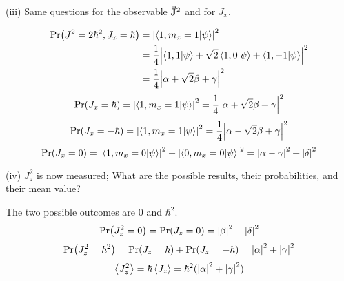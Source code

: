 \documentclass[a4paper,twoside]{article}
\begin{document}
\begin{itemize}
        \subitem(iii) Same questions for the observable $ \va{J}^2 $ and for $ J_x $.
        \begin{problem}
            \begin{align}
                \Pr(J^2 = 2 \hbar^2, J_x = \hbar) &= \abs{\bra{1, m_x = 1}\ket{\psi}}^2 \\
                &= \frac{1}{4} \abs{\bra{1,1}\ket{\psi} + \sqrt{2}\bra{1,0}\ket{\psi} +\bra{1,-1}\ket{\psi}}^2 \\
                &= \frac{1}{4} \abs{\alpha + \sqrt{2} \beta + \gamma}^2
            \end{align}
            \begin{equation}
                \Pr(J_x = \hbar) = \abs{\bra{1,m_x = 1}\ket{\psi}}^2 = \frac{1}{4} \abs{\alpha + \sqrt{2} \beta + \gamma}^2
            \end{equation}
            \begin{equation}
                \Pr(J_x = - \hbar) = \abs{\bra{1,m_x = 1}\ket{\psi}}^2 = \frac{1}{4} \abs{\alpha - \sqrt{2} \beta + \gamma}^2
            \end{equation}
            \begin{equation}
                \Pr(J_x = 0) = \abs{\bra{1,m_x = 0}\ket{\psi}}^2 + \abs{\bra{0,m_x = 0}\ket{\psi}}^2 = \abs{\alpha - \gamma}^2 + \abs{\delta}^2
            \end{equation}
        \end{problem}
        \subitem(iv) $ J_z^2 $ is now measured; What are the possible results, their probabilities, and their mean value?
        \begin{problem}
            The two possible outcomes are $ 0 $ and $ \hbar^2 $.
            \begin{equation}
                \Pr(J^2_z = 0) = \Pr(J_z = 0) = \abs{\beta}^2 + \abs{\delta}^2
            \end{equation}
            \begin{equation}
                \Pr(J^2_z = \hbar^2) = \Pr(J_z = \hbar) + \Pr(J_z = - \hbar) = \abs{\alpha}^2 + \abs{\gamma}^2
            \end{equation}
            \begin{equation}
                \ev{J_z^2} = \hbar \ev{J_z} = \hbar^2 (\abs{\alpha}^2 + \abs{\gamma}^2)
            \end{equation}
        \end{problem}
\end{itemize}
\end{document}
